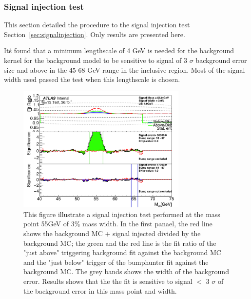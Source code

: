 \subsubsection{Signal injection test} 


This section detailed the procedure to the signal injection test Section~\ref{sec:signalinjection}. Only results are presented here.

It\'s found that a minimum lengthscale of 4 GeV is needed for the background kernel for the background model to be sensitive to signal of 3 $\sigma$ background error size and above in the 45-68 GeV range in the inclusive region. Most of the signal width used passed the test when this lengthscale is chosen. 

\begin{figure}[!htb]
    \begin{center}
        \includegraphics[width=0.75\textwidth]{figures/chapter_dimuon/signalInjection}        
        \caption{
        This figure illustrate a signal injection test performed at the mass point 55GeV of 3\% mass width. In the first panael, the red line shows the background MC + signal injected divided by the background MC; the green and the red line is the fit ratio of the "just above" triggering background fit against the background MC and the "just below" trigger of the bumphunter fit against the background MC. The grey bands shows the width of the background error. Results shows that the the fit is sensitive to signal $<$ 3 $\sigma$ of the background error in this mass point and width. }
    \label{fig:dimuonstudies}
    \end{center}
\end{figure}
\FloatBarrier


